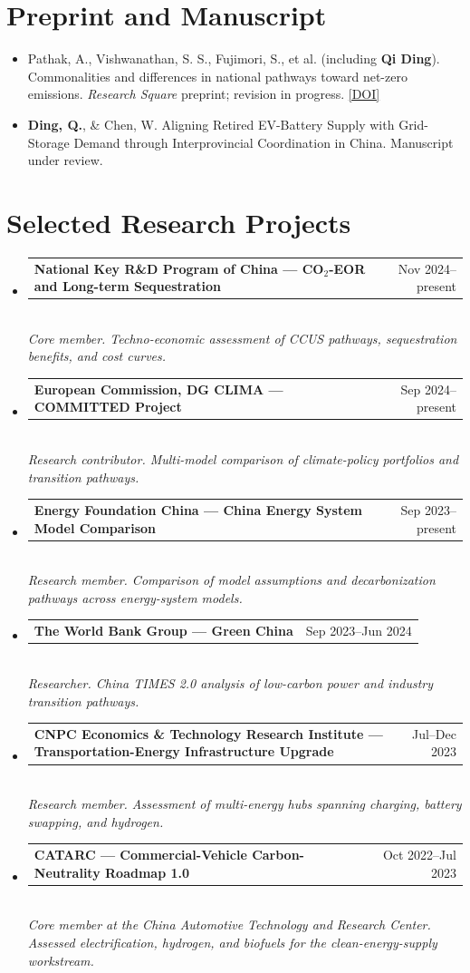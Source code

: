 \documentclass[10pt,a4paper]{article}
\makeatletter
\newcommand{\project}[4]{%
  \item \begin{tabularx}{\linewidth}{@{}Xr@{}}
    \textbf{#1 --- #2} & \textcolor{secondary}{#4}
  \end{tabularx}\vspace{-0.32em}\\
  \textit{#3}}
\makeatother
\begin{document}
\section{Preprint and Manuscript}
\begin{itemize}
  \item Pathak, A., Vishwanathan, S. S., Fujimori, S., et al. (including \textbf{Qi Ding}). Commonalities and differences in national pathways toward net-zero emissions. \textit{Research Square} preprint; revision in progress. \href{https://doi.org/10.21203/rs.3.rs-8802998/v1}{[DOI]}
  \item \textbf{Ding, Q.}, \& Chen, W. Aligning Retired EV-Battery Supply with Grid-Storage Demand through Interprovincial Coordination in China. Manuscript under review.
\end{itemize}

\section{Selected Research Projects}
\begin{itemize}
  \project{National Key R\&D Program of China}{CO$_2$-EOR and Long-term Sequestration}{Core member. Techno-economic assessment of CCUS pathways, sequestration benefits, and cost curves.}{Nov 2024--present}
  \project{European Commission, DG CLIMA}{COMMITTED Project}{Research contributor. Multi-model comparison of climate-policy portfolios and transition pathways.}{Sep 2024--present}
  \project{Energy Foundation China}{China Energy System Model Comparison}{Research member. Comparison of model assumptions and decarbonization pathways across energy-system models.}{Sep 2023--present}
  \project{The World Bank Group}{Green China}{Researcher. China TIMES 2.0 analysis of low-carbon power and industry transition pathways.}{Sep 2023--Jun 2024}
  \project{CNPC Economics \& Technology Research Institute}{Transportation-Energy Infrastructure Upgrade}{Research member. Assessment of multi-energy hubs spanning charging, battery swapping, and hydrogen.}{Jul--Dec 2023}
  \project{CATARC}{Commercial-Vehicle Carbon-Neutrality Roadmap 1.0}{Core member at the China Automotive Technology and Research Center. Assessed electrification, hydrogen, and biofuels for the clean-energy-supply workstream.}{Oct 2022--Jul 2023}
\end{itemize}

\newpage
\end{document}
